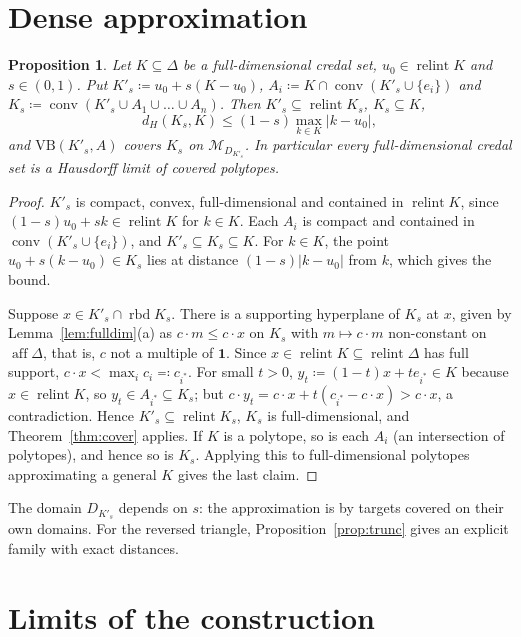 \documentclass[11pt]{article}
\newcommand{\one}{\mathbf{1}}
\newcommand{\M}{\mathcal{M}}
\newcommand{\VB}{\mathrm{VB}}
\DeclareMathOperator{\conv}{conv}
\DeclareMathOperator{\relint}{relint}
\DeclareMathOperator{\rbd}{rbd}
\DeclareMathOperator{\aff}{aff}
\theoremstyle{plain}
\newtheorem{proposition}[theorem]{Proposition}
\theoremstyle{definition}
\theoremstyle{remark}
\begin{document}
\section{Dense approximation}\label{sec:dense}

\begin{proposition}\label{prop:dense}
Let $K\subseteq\Delta$ be a full-dimensional credal set, $u_0\in\relint K$ and
$s\in(0,1)$. Put $K'_s\coloneqq u_0+s(K-u_0)$, $A_i\coloneqq K\cap\conv(K'_s\cup\{e_i\})$
and $K_s\coloneqq\conv(K'_s\cup A_1\cup\dots\cup A_n)$. Then $K'_s\subseteq\relint K_s$,
$K_s\subseteq K$,
\[
  d_H(K_s,K)\le(1-s)\max_{k\in K}|k-u_0|,
\]
and $\VB(K'_s,A)$ covers $K_s$ on $\M_{D_{K'_s}}$. In particular every full-dimensional
credal set is a Hausdorff limit of covered polytopes.
\end{proposition}

\begin{proof}
$K'_s$ is compact, convex, full-dimensional and contained in $\relint K$, since
$(1-s)u_0+sk\in\relint K$ for $k\in K$. Each $A_i$ is compact and contained in
$\conv(K'_s\cup\{e_i\})$, and $K'_s\subseteq K_s\subseteq K$. For $k\in K$, the point
$u_0+s(k-u_0)\in K_s$ lies at distance $(1-s)|k-u_0|$ from $k$, which gives the bound.

Suppose $x\in K'_s\cap\rbd K_s$. There is a supporting hyperplane of $K_s$ at $x$, given by
Lemma~\ref{lem:fulldim}(a) as $c\cdot m\le c\cdot x$ on $K_s$ with $m\mapsto c\cdot m$
non-constant on $\aff\Delta$, that is, $c$ not a multiple of $\one$. Since $x\in\relint
K\subseteq\relint\Delta$ has full support, $c\cdot x<\max_ic_i\eqqcolon c_{i^\ast}$. For
small $t>0$, $y_t\coloneqq(1-t)x+te_{i^\ast}\in K$ because $x\in\relint K$, so $y_t\in
A_{i^\ast}\subseteq K_s$; but $c\cdot y_t=c\cdot x+t(c_{i^\ast}-c\cdot x)>c\cdot x$, a
contradiction. Hence $K'_s\subseteq\relint K_s$, $K_s$ is full-dimensional, and
Theorem~\ref{thm:cover} applies. If $K$ is a polytope, so is each $A_i$ (an intersection
of polytopes), and hence so is $K_s$. Applying this to full-dimensional polytopes
approximating a general $K$ gives the last claim.
\end{proof}

The domain $D_{K'_s}$ depends on $s$: the approximation is by targets covered on their own
domains. For the reversed triangle, Proposition~\ref{prop:trunc} gives an explicit family
with exact distances.

\section{Limits of the construction}\label{sec:limits}
\end{document}
